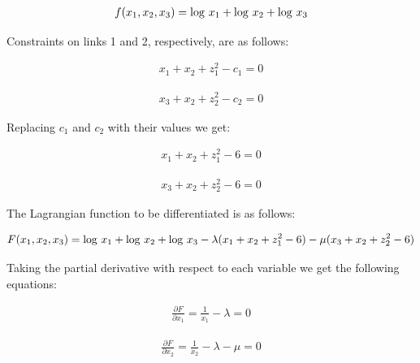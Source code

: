 \documentclass{article}
\def\pd#1#2{\frac{\partial#1}{\partial#2}}   %
\def\lg{{\rm log}}
\begin{document}
\begin{enumerate}
\begin{itemize}
\vspace{-3mm}

\begin{eqnarray*}
f(x_1, x_2, x_3) = \lg ~x_1 + \lg ~x_2 + \lg ~x_3
\end{eqnarray*}

\noindent Constraints on links 1 and 2, respectively, are as
follows:

\vspace{-5mm}

\begin{eqnarray*}
x_1 + x_2 + z_1^2 - c_1 = 0
\end{eqnarray*}

\vspace{-5mm}

\begin{eqnarray*}
x_3 + x_2 + z_2^2 - c_2 = 0
\end{eqnarray*}


\noindent Replacing $c_1$ and $c_2$ with their values we get:

\vspace{-5mm}

\begin{eqnarray*}
x_1 + x_2 + z_1^2 - 6 = 0
\end{eqnarray*}

\vspace{-5mm}

\begin{eqnarray*}
x_3 + x_2 + z_2^2 - 6 = 0
\end{eqnarray*}

\noindent The Lagrangian function to be differentiated is as
follows:

\vspace{-5mm}

\begin{eqnarray*}
F(x_1, x_2, x_3) = \lg ~x_1 + \lg ~x_2 + \lg ~x_3 - \lambda (x_1 +
x_2 + z_1^2 - 6) - \mu(x_3 + x_2 + z_2^2 - 6)
\end{eqnarray*}

\noindent Taking the partial derivative with respect to each
variable we get the following equations:

\begin{eqnarray*}
\pd{F}{x_1} = {\frac {1}{x_1}} - \lambda = 0
\end{eqnarray*}

\begin{eqnarray*}
\pd{F}{x_2} = {\frac {1}{x_2}} - \lambda - \mu = 0
\end{eqnarray*}


\end{itemize}
\end{enumerate}
\end{document}
